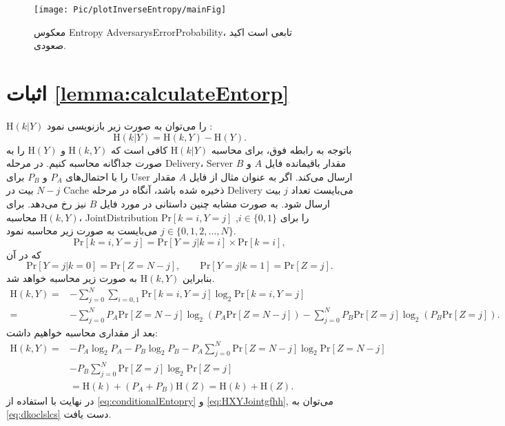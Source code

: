 \begin{figure}
\texttt{[image: Pic/plotInverseEntropy/mainFig]}
\caption{
معکوس \gls*{Entropy}
\gls*{AdversarysErrorProbability}،
تابعی است اکید صعودی.
}
\label{fig:plotInverseEntropy}
\end{figure}



\section{اثبات \autoref{lemma:calculateEntorp}}
\label{subsec:appcalculateEntorp}
$\mathrm{H}(k|Y)$
را می‌توان به صورت زیر بازنویسی نمود
\cite[بخش $2.2$]{cover2006elements}:
\begin{equation}
\mathrm{H}(k|Y) = \mathrm{H}(k,Y)-\mathrm{H}(Y).
\label{eq:conditionalEntopry}
\end{equation}
باتوجه به رابطه فوق، برای محاسبه 
$\mathrm{H}(k|Y)$
کافی است که 
$\mathrm{H}(k,Y)$ و $\mathrm{H}(Y)$
را به صورت جداگانه محاسبه کنیم. در مرحله 
\gls{Delivery}، \gls{Server}
مقدار باقیمانده فایل $A$ و $B$ را با احتمال‌های 
$P_A$ و $P_B$ برای \gls{User}
ارسال می‌کند. اگر به عنوان مثال از فایل $A$ مقدار
$N-j$
بیت در 
\gls{Cache}
ذخیره شده باشد، آنگاه در مرحله
\gls{Delivery}
می‌بایست تعداد $j$ بیت ارسال شود. به صورت مشابه چنین داستانی در مورد فایل $B$ نیز رخ می‌دهد. برای  محاسبه
$\mathrm{H}(k,Y)$، \gls{JointDistribution} $\mathrm{Pr}[k=i,Y=j]$
را برای 
$i\in \{0,1\}$, $j\in \{0,1,2,\ldots, N\}$
می‌بایست به صورت زیر محاسبه نمود. 
\begin{equation}
\mathrm{Pr}[k=i,Y=j] =\mathrm{Pr}[Y=j|k=i] \times \mathrm{Pr}[k=i],
\label{eq:urjdmk}
\end{equation}
که در آن
\begin{equation*}
\mathrm{Pr}[Y=j|k=0] = \mathrm{Pr}[Z=N-j],\quad \quad 
\mathrm{Pr}[Y=j|k=1] = \mathrm{Pr}[Z=j].
\end{equation*}
بنابراین $\mathrm{H}(k,Y)$  به صورت زیر محاسبه خواهد شد. 
\begin{align} 
\mathrm{H}(k,Y) =& -\sum_{j=0}^{N}\sum_{i=0,1}\mathrm{Pr}[k=i,Y=j] \log_2 \mathrm{Pr}[k=i,Y=j] \\
=& -\sum_{j=0}^{N} P_A\mathrm{Pr}[Z=N-j]\log_2 (P_A\mathrm{Pr}[Z=N-j]) -\sum_{j=0}^{N} P_B\mathrm{Pr}[Z=j]\log_2 (P_B\mathrm{Pr}[Z=j]). \nonumber
\end{align}
بعد از مقداری محاسبه خواهیم داشت:
\begin{align}
\mathrm{H}(k,Y)  =& -P_A\log_2 P_A - P_B\log_2 P_B 
- P_A\sum_{j=0}^{N}\mathrm{Pr}[Z=N-j]\log_2 \mathrm{Pr}[Z=N-j] \nonumber\\
& - P_B\sum_{j=0}^{N}\mathrm{Pr}[Z=j]\log_2 \mathrm{Pr}[Z=j]\nonumber\\
& = \mathrm{H}(k)+ (P_A+P_B)\mathrm{H}(Z) = \mathrm{H}(k)+\mathrm{H}(Z).
\label{eq:HXYJointgfhh}
\end{align}
در نهایت با استفاده از
 \eqref{eq:conditionalEntopry} و \eqref{eq:HXYJointgfhh}, 
 می‌توان به
  \eqref{eq:dkoclslcs}
  دست یافت. 



